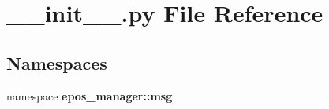 \section{\-\_\-\-\_\-init\-\_\-\-\_\-.\-py \-File \-Reference}
\label{msg_2____init_____8py}
\subsection*{\-Namespaces}
\begin{DoxyCompactItemize}
\item 
namespace {\bf epos\-\_\-manager\-::msg}
\end{DoxyCompactItemize}
